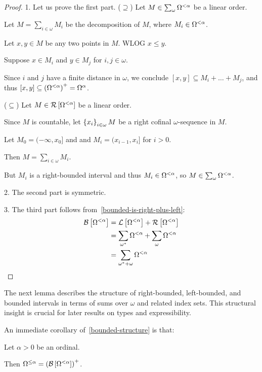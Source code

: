\begin{proof}
  1. Let us prove the first part.
  ($\supseteq$) Let $M \in \sum_{\omega}{\Omega^{< \alpha}}$ be a linear order.

  Let $M = \sum_{i \in \omega} M_i$ be the decomposition of $M$,
  where $M_i \in \Omega^{< \alpha}$.

  Let $x, y \in M$ be any two points in $M$. WLOG $x \le y$.

  Suppose $x \in M_i$ and $y \in M_j$ for $i, j \in \omega$.

  Since $i$ and $j$ have a finite distance in $\omega$,
  we conclude $[x, y] \subseteq M_i + \ldots + M_j$,
  and thus $[x, y] \subseteq \left( {\Omega^{< \alpha}} \right)^+ = \Omega^{{\alpha}}$.

  ($\subseteq$) Let $M \in \mathcal{R} \left[ {{\Omega^{< \alpha}}} \right]$ be a linear order.

  Since $M$ is countable, let $\left\{ {x_i} \right\}_{i \in \omega} M$ be a right cofinal
  $\omega$-sequence in $M$.

  Let $M_0 = (-\infty, x_0]$ and and $M_i = (x_{i-1}, x_{i}]$ for $i > 0$.

  Then $M = \sum_{i \in \omega} M_i$.

  But $M_i$ is a right-bounded interval and thus $M_i \in \Omega^{< \alpha}$, so $M \in \sum_{\omega}{\Omega^{< \alpha}}$.

  2. The second part is symmetric.

  3. The third part follows from~\cref{bounded-is-right-plus-left}:
  \begin{align*}
    \mathcal{B} \left[ {{\Omega^{< \alpha}}} \right]
     & = \mathcal{L} \left[ {{\Omega^{< \alpha}}} \right] + \mathcal{R} \left[ {{\Omega^{< \alpha}}} \right]                     \\
     & = \sum_{\omega^\ast}{\Omega^{< \alpha}} + \sum_{\omega}{\Omega^{< \alpha}} \\
     & = \sum_{\omega^\ast + \omega}{\Omega^{< \alpha}}
  \end{align*}
\end{proof}

The next lemma describes the structure of right-bounded, left-bounded, and bounded intervals in terms of sums over $\omega$
and related index sets. This structural insight is crucial for later results on types and expressibility.

An immediate corollary of~\cref{bounded-structure} is that:
\begin{corollary}
  Let $\alpha > 0$ be an ordinal.

  Then $\Omega^{\le \alpha} = \left( {\mathcal{B} \left[ {{\Omega^{< \alpha}}} \right]} \right)^+$.
\end{corollary}

